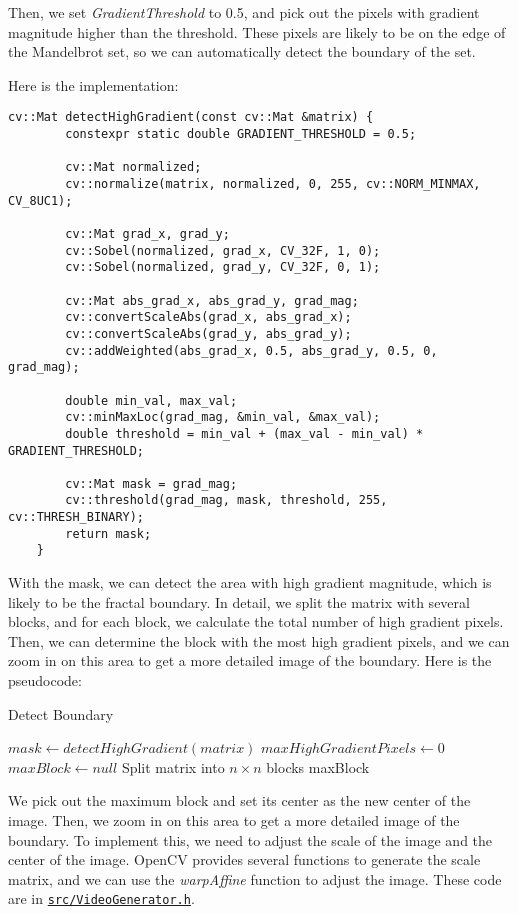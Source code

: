 Then, we set \textit{GradientThreshold}
to 0.5, and pick out the pixels with gradient magnitude higher than the threshold.
These pixels are likely to be on the edge of the Mandelbrot set, so we can automatically detect the boundary of the
set.

Here is the implementation:

\begin{lstlisting}[label={lst:detect_high_gradient}, gobble=8]
    cv::Mat detectHighGradient(const cv::Mat &matrix) {
        constexpr static double GRADIENT_THRESHOLD = 0.5;

        cv::Mat normalized;
        cv::normalize(matrix, normalized, 0, 255, cv::NORM_MINMAX, CV_8UC1);

        cv::Mat grad_x, grad_y;
        cv::Sobel(normalized, grad_x, CV_32F, 1, 0);
        cv::Sobel(normalized, grad_y, CV_32F, 0, 1);

        cv::Mat abs_grad_x, abs_grad_y, grad_mag;
        cv::convertScaleAbs(grad_x, abs_grad_x);
        cv::convertScaleAbs(grad_y, abs_grad_y);
        cv::addWeighted(abs_grad_x, 0.5, abs_grad_y, 0.5, 0, grad_mag);

        double min_val, max_val;
        cv::minMaxLoc(grad_mag, &min_val, &max_val);
        double threshold = min_val + (max_val - min_val) * GRADIENT_THRESHOLD;

        cv::Mat mask = grad_mag;
        cv::threshold(grad_mag, mask, threshold, 255, cv::THRESH_BINARY);
        return mask;
    }
\end{lstlisting}

With the mask, we can detect the area with high gradient magnitude, which is likely to be the fractal boundary.
In detail, we split the matrix with several blocks, and for each block, we calculate the total number of high
gradient pixels.
Then, we can determine the block with the most high gradient pixels, and we can zoom in on this area to get a more
detailed image of the boundary.
Here is the pseudocode:


\begin{algorithm}[H]
    \SetAlgoLined
    \caption{Detect Boundary}
    \label{alg:detect_boundary}
    $mask \leftarrow detectHighGradient(matrix)$\;
    $maxHighGradientPixels \leftarrow 0$\;
    $maxBlock \leftarrow null$\;
    Split matrix into $n \times n$ blocks\;
    \Return maxBlock\;
\end{algorithm}

We pick out the maximum block and set its center as the new center of the image.
Then, we zoom in on this area to get a more detailed image of the boundary.
To implement this, we need to adjust the scale of the image and the center of the image.
OpenCV provides several functions to generate the scale matrix, and we can use the \textit{warpAffine}
function to adjust the image.
These code are in \href{https://github.com/AI1379/MandelbrotSet/blob/master/src/VideoGenerator.h}
{\texttt{src/VideoGenerator.h}}.